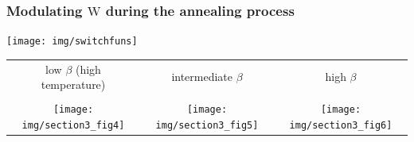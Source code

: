 \begin{frame} \frametitle{Modulating $\mathrm W$ during the annealing process}
  \begin{center}
    \texttt{[image: img/switchfuns]}
\vspace{5mm}
  \oident\oident\begin{tabular}[h]{c c c}
    low $\beta$ (high temperature) & intermediate $\beta$  & high $\beta$\\\\
    \texttt{[image: img/section3\_fig4]}
    & \hspace{-0.5cm}\texttt{[image: img/section3\_fig5]}
    & \texttt{[image: img/section3\_fig6]}
  \end{tabular}
\vspace{5mm}
  \end{center}
  \vspace{-2cm}

\\

\end{frame}


